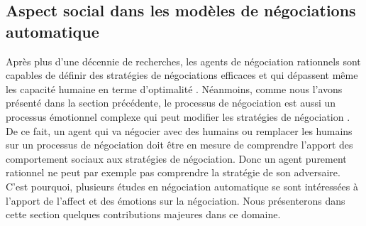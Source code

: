 	
	

	
	
	\subsection{Aspect social dans les modèles de négociations automatique}
	
	 Après plus d'une décennie de recherches, les agents de négociation rationnels sont capables de définir des stratégies de négociations efficaces et qui dépassent même les capacité humaine en terme d'optimalité \cite{jonker2012negotiating}. Néanmoins, comme nous l'avons présenté dans la section précédente, le processus de négociation est aussi un processus émotionnel complexe qui peut modifier les stratégies de négociation \cite{broekens2010affective}. De ce fait, 
	 un agent qui va négocier avec des humains ou remplacer les humains sur un processus de négociation doit être en mesure de comprendre l'apport des comportement sociaux aux stratégies de négociation. Donc un agent purement rationnel ne peut par exemple pas comprendre la stratégie de son adversaire. 
	 C'est pourquoi, plusieurs études en négociation automatique se sont intéressées à l'apport de l'affect et des émotions sur la négociation. Nous présenterons dans cette section quelques contributions majeures dans ce domaine. 
	 
